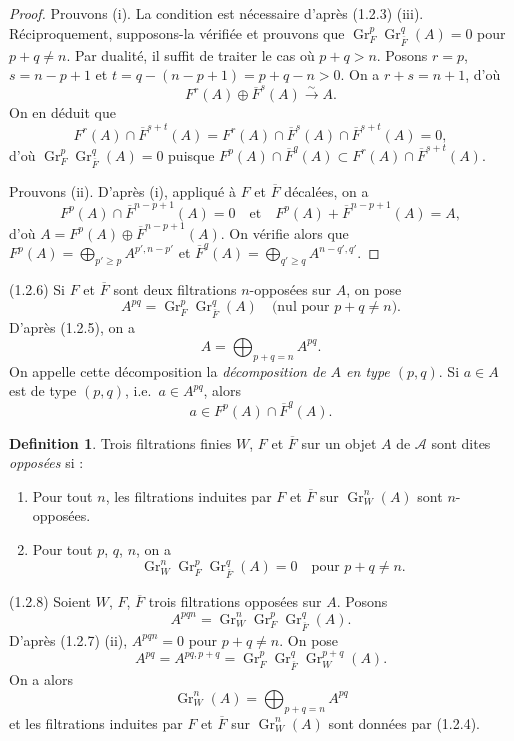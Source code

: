 \documentclass[11pt,a4paper]{amsart}
\theoremstyle{plain}
\theoremstyle{definition}
\newtheorem{definition}[theorem]{Definition}
\theoremstyle{remark}
\DeclareMathOperator{\Gr}{Gr}
\newcommand{\sA}{\mathscr{A}}
\numberwithin{equation}{subsection}
\begin{document}
\begin{proof}
Prouvons (i). La condition est n\'ecessaire d'apr\`es (1.2.3) (iii). R\'eciproquement,
supposons-la v\'erifi\'ee et prouvons que $\Gr_F^p \Gr_{\overline{F}}^q(A) = 0$ pour $p+q \neq n$.
Par dualit\'e, il suffit de traiter le cas o\`u $p+q > n$. Posons $r = p$, $s = n-p+1$ et
$t = q-(n-p+1) = p+q-n > 0$. On a $r+s = n+1$, d'o\`u
\[
F^r(A) \oplus \overline{F}^s(A) \xrightarrow{\sim} A.
\]
On en d\'eduit que
\[
F^r(A) \cap \overline{F}^{s+t}(A) = F^r(A) \cap \overline{F}^s(A) \cap \overline{F}^{s+t}(A) = 0,
\]
d'o\`u $\Gr_F^p \Gr_{\overline{F}}^q(A) = 0$ puisque $F^p(A) \cap \overline{F}^q(A) \subset F^r(A) \cap \overline{F}^{s+t}(A)$.

Prouvons (ii). D'apr\`es (i), appliqu\'e \`a $F$ et $\overline{F}$ d\'ecal\'ees, on a
\[
F^p(A) \cap \overline{F}^{n-p+1}(A) = 0 \quad \text{et} \quad F^p(A) + \overline{F}^{n-p+1}(A) = A,
\]
d'o\`u $A = F^p(A) \oplus \overline{F}^{n-p+1}(A)$. On v\'erifie alors que $F^p(A) = \bigoplus_{p' \geqslant p} A^{p',n-p'}$
et $\overline{F}^q(A) = \bigoplus_{q' \geqslant q} A^{n-q',q'}$.
\end{proof}

(1.2.6) Si $F$ et $\overline{F}$ sont deux filtrations $n$-oppos\'ees sur $A$, on pose
\[
A^{pq} = \Gr_F^p \Gr_{\overline{F}}^q(A) \quad \text{(nul pour } p+q \neq n \text{)}.
\]
D'apr\`es (1.2.5), on a
\[
A = \bigoplus_{p+q=n} A^{pq}.
\]
On appelle cette d\'ecomposition la \emph{d\'ecomposition de $A$ en type $(p,q)$}.
Si $a \in A$ est de type $(p,q)$, i.e.~$a \in A^{pq}$, alors
\[
a \in F^p(A) \cap \overline{F}^q(A).
\]

\begin{definition}\label{def:1.2.7}
Trois filtrations finies $W$, $F$ et $\overline{F}$ sur un objet $A$ de $\sA$ sont dites
\emph{oppos\'ees} si :
\begin{enumerate}
\item[(i)] Pour tout $n$, les filtrations induites par $F$ et $\overline{F}$ sur $\Gr_W^n(A)$ sont $n$-oppos\'ees.
\item[(ii)] Pour tout $p$, $q$, $n$, on a
\[
\Gr_W^n \Gr_F^p \Gr_{\overline{F}}^q(A) = 0 \quad \text{pour } p+q \neq n.
\]
\end{enumerate}
\end{definition}

(1.2.8) Soient $W$, $F$, $\overline{F}$ trois filtrations oppos\'ees sur $A$. Posons
\[
A^{pqn} = \Gr_W^n \Gr_F^p \Gr_{\overline{F}}^q(A).
\]
D'apr\`es (1.2.7) (ii), $A^{pqn} = 0$ pour $p+q \neq n$. On pose
\[
A^{pq} = A^{pq,p+q} = \Gr_F^p \Gr_{\overline{F}}^q \Gr_W^{p+q}(A).
\]
On a alors
\[
\Gr_W^n(A) = \bigoplus_{p+q=n} A^{pq}
\]
et les filtrations induites par $F$ et $\overline{F}$ sur $\Gr_W^n(A)$ sont donn\'ees par (1.2.4).
\end{document}
